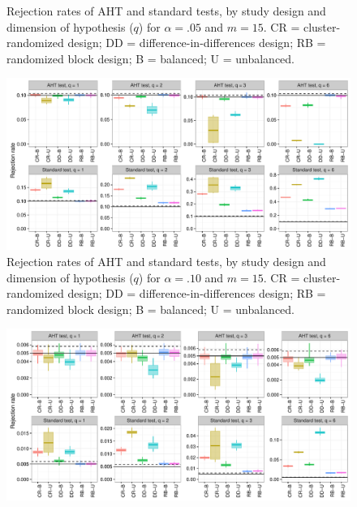 \documentclass{article}\usepackage[]{graphicx}\usepackage[]{color}
\newenvironment{knitrout}{}{} %
\begin{document}
\begin{landscape}
\begin{knitrout}
\begin{figure}[H]
{}

\caption[Rejection rates of AHT and standard tests, by study design and dimension of hypothesis (]{Rejection rates of AHT and standard tests, by study design and dimension of hypothesis ($q$) for $\alpha = .05$ and $m = 15$. CR = cluster-randomized design; DD = difference-in-differences design; RB = randomized block design; B = balanced; U = unbalanced.}\label{fig:balance_05_15}
\end{figure}


\end{knitrout}

\begin{knitrout}
\color{fgcolor}\begin{figure}[H]

{\centering \includegraphics[width=\linewidth]{CR_fig/balance_10_15-1} 

}

\caption[Rejection rates of AHT and standard tests, by study design and dimension of hypothesis (]{Rejection rates of AHT and standard tests, by study design and dimension of hypothesis ($q$) for $\alpha = .10$ and $m = 15$. CR = cluster-randomized design; DD = difference-in-differences design; RB = randomized block design; B = balanced; U = unbalanced.}\label{fig:balance_10_15}
\end{figure}


\end{knitrout}

\begin{knitrout}
\color{fgcolor}\begin{figure}[H]

{\centering \includegraphics[width=\linewidth]{CR_fig/balance_005_30-1} 

}
\end{figure}
\end{knitrout}
\end{landscape}
\end{document}
